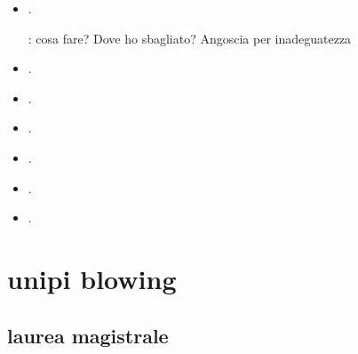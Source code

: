 \begin{itemize}
(tachicardia pre/post bike)

continuare a svegliarsi addormentarsi/non sono capace di alzarmi come non sono capace di pianificare concretamente/ agire

mensa fame cibo: 


caf\'e exploit: angoscia interazione 

sul sedile

\item {}.

: cosa fare? Dove ho sbagliato? Angoscia per inadeguatezza

\item {}.



\item {}.



\item {}.




\item {}.



\item {}.

\item {}.


\end{itemize}


\section{unipi blowing}

\subsection{laurea magistrale}

